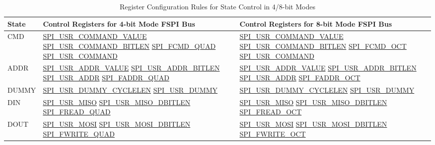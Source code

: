 \documentclass[main\_\_EN.tex]{subfiles}
\begin{document}
\begin{longtable}[c]{ |L{1.5cm}|L{5.0cm}|L{4.6cm}| }
\caption{Register Configuration Rules for State Control in 4/8-bit Modes}
\label{table:SPI_USR2}\\\hline
{}
State & Control Registers for 4-bit Mode FSPI Bus & Control Registers for 8-bit Mode FSPI Bus \\
     \hline
CMD  &\hyperref[fielddesc:SPIUSRCOMMANDVALUE]{SPI\_USR\_COMMAND\_VALUE}  \hyperref[fielddesc:SPIUSRCOMMANDBITLEN]{SPI\_USR\_COMMAND\_BITLEN}   \hyperref[fielddesc:SPIFCMDQUAD]{SPI\_FCMD\_QUAD}    \hyperref[fielddesc:SPIUSRCOMMAND]{SPI\_USR\_COMMAND}
     &\hyperref[fielddesc:SPIUSRCOMMANDVALUE]{SPI\_USR\_COMMAND\_VALUE}  \hyperref[fielddesc:SPIUSRCOMMANDBITLEN]{SPI\_USR\_COMMAND\_BITLEN}   \hyperref[fielddesc:SPIFCMDOCT]{SPI\_FCMD\_OCT}     \hyperref[fielddesc:SPIUSRCOMMAND]{SPI\_USR\_COMMAND}\\
     \hline
ADDR &\hyperref[fielddesc:SPIUSRADDRVALUE]{SPI\_USR\_ADDR\_VALUE}   \hyperref[fielddesc:SPIUSRADDRBITLEN]{SPI\_USR\_ADDR\_BITLEN}    \hyperref[fielddesc:SPIUSRADDR]{SPI\_USR\_ADDR}                \hyperref[fielddesc:SPIFADDRQUAD]{SPI\_FADDR\_QUAD}
     &\hyperref[fielddesc:SPIUSRADDRVALUE]{SPI\_USR\_ADDR\_VALUE}   \hyperref[fielddesc:SPIUSRADDRBITLEN]{SPI\_USR\_ADDR\_BITLEN}    \hyperref[fielddesc:SPIUSRADDR]{SPI\_USR\_ADDR}      \hyperref[fielddesc:SPIFADDROCT]{SPI\_FADDR\_OCT}\\
     \hline
DUMMY &\hyperref[fielddesc:SPIUSRDUMMYCYCLELEN]{SPI\_USR\_DUMMY\_CYCLELEN}     \hyperref[fielddesc:SPIUSRDUMMY]{SPI\_USR\_DUMMY}
     &\hyperref[fielddesc:SPIUSRDUMMYCYCLELEN]{SPI\_USR\_DUMMY\_CYCLELEN}     \hyperref[fielddesc:SPIUSRDUMMY]{SPI\_USR\_DUMMY}\\
     \hline
DIN  &\hyperref[fielddesc:SPIUSRMISO]{SPI\_USR\_MISO}  \hyperref[fielddesc:SPIUSRMISODBITLEN]{SPI\_USR\_MISO\_DBITLEN}  \hyperref[fielddesc:SPIFREADQUAD]{SPI\_FREAD\_QUAD}
     &\hyperref[fielddesc:SPIUSRMISO]{SPI\_USR\_MISO}  \hyperref[fielddesc:SPIUSRMISODBITLEN]{SPI\_USR\_MISO\_DBITLEN}  \hyperref[fielddesc:SPIFREADOCT]{SPI\_FREAD\_OCT}\\
     \hline
DOUT &\hyperref[fielddesc:SPIUSRMOSI]{SPI\_USR\_MOSI}       \hyperref[fielddesc:SPIUSRMOSIDBITLEN]{SPI\_USR\_MOSI\_DBITLEN}       \hyperref[fielddesc:SPIFWRITEQUAD]{SPI\_FWRITE\_QUAD}
     &\hyperref[fielddesc:SPIUSRMOSI]{SPI\_USR\_MOSI}       \hyperref[fielddesc:SPIUSRMOSIDBITLEN]{SPI\_USR\_MOSI\_DBITLEN}       \hyperref[fielddesc:SPIFWRITEOCT]{SPI\_FWRITE\_OCT}\\
     \hline
\end{longtable}
\end{document}
